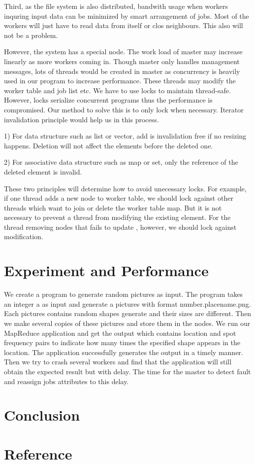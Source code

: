 \documentclass[12pt]{article}
\begin{document}
Third, as the file system is also distributed, bandwith usage when workers inquring input data can be minimized by smart arrangement of jobs. Most of the workers will just have to read data from itself or clos neighbours. This also will not be a problem. 

However, the system has a special node. The work load of master may increase linearly as more workers coming in. Though master only handles management messages, lots of threads would be created in master as concurrency is heavily used in our program to increase performance. These threads may modify the worker table and job list etc. We have to use locks to maintain thread-safe. However, locks serialize concurrent programs thus the performance is compromised. Our method to solve this is to only lock when necessary. Iterator invalidation principle would help us in this process.

1) For data structure such as list or vector, add is invalidation free if no resizing happens. Deletion will not affect the elements before the deleted one.

2) For associative data structure such as map or set, only the reference of the deleted element is invalid.

These two principles will determine how to avoid unecessary locks. For example, if one thread adds a new node to worker table, we should lock against other threads which want to join or delete the worker table map. But it is not necessary to prevent a thread from modifying the existing element. For the thread removing nodes that fails to update , however, we should lock against modification.        
   

\section{Experiment and Performance }

We create a program to generate random pictures as input. The program takes an integer a as input and generate a pictures with format number.placename.png.  Each pictures contains random shapes generate and their sizes are different. Then we make several copies of these pictures and store them in the nodes. We run our MapReduce application and get the output which contains location and spot frequency pairs to indicate how many times the specified shape appears in the location. The application successfully generates the output in a timely manner. Then we try to crash several workers and find that the application will still obtain the expected result but with delay. The time for the master to detect fault and reassign jobs attributes to this delay.
  
\section {Conclusion}

\section*{Reference}
\end{document}
